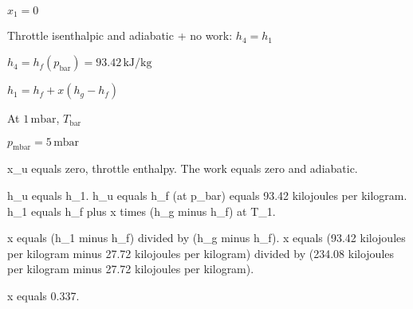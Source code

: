\( x_1 = 0 \)  

Throttle isenthalpic and adiabatic + no work: \( h_4 = h_1 \)  

\( h_4 = h_f (p_{\text{bar}}) = 93.42 \, \text{kJ/kg} \)  

\( h_1 = h_f + x (h_g - h_f) \)  

At \( 1 \, \text{mbar} \), \( T_{\text{bar}} \)  

\( p_{\text{mbar}} = 5 \, \text{mbar} \)

x_u equals zero, throttle enthalpy.  
The work equals zero and adiabatic.  

h_u equals h_1.  
h_u equals h_f (at p_bar) equals 93.42 kilojoules per kilogram.  
h_1 equals h_f plus x times (h_g minus h_f) at T_1.  

x equals (h_1 minus h_f) divided by (h_g minus h_f).  
x equals (93.42 kilojoules per kilogram minus 27.72 kilojoules per kilogram) divided by (234.08 kilojoules per kilogram minus 27.72 kilojoules per kilogram).  

x equals 0.337.